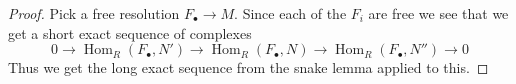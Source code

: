 \documentclass[10pt,a4paper]{amsart}
\theoremstyle{plain}
\theoremstyle{definition}
\theoremstyle{remark}
\numberwithin{equation}{subsection}
\def\Hom{\mathop{\mathrm{Hom}}\nolimits}
\begin{document}
\begin{proof}
Pick a free resolution $F_{\bullet} \to M$.
Since each of the $F_i$ are free we see that
we get a short exact sequence of complexes
$$
0 \to
\Hom_R(F_{\bullet}, N') \to
\Hom_R(F_{\bullet}, N) \to
\Hom_R(F_{\bullet}, N'') \to
0
$$
Thus we get the long exact sequence from
the snake lemma applied to this.
\end{proof}
\end{document}
